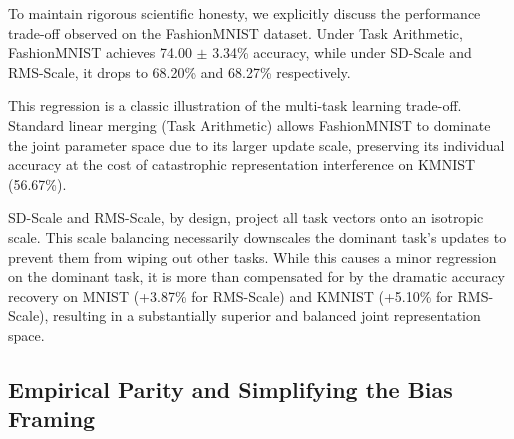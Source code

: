 To maintain rigorous scientific honesty, we explicitly discuss the performance trade-off observed on the FashionMNIST dataset. Under Task Arithmetic, FashionMNIST achieves 74.00 $\pm$ 3.34\% accuracy, while under SD-Scale and RMS-Scale, it drops to 68.20\% and 68.27\% respectively. 

This regression is a classic illustration of the multi-task learning trade-off. Standard linear merging (Task Arithmetic) allows FashionMNIST to dominate the joint parameter space due to its larger update scale, preserving its individual accuracy at the cost of catastrophic representation interference on KMNIST (56.67\%). 

SD-Scale and RMS-Scale, by design, project all task vectors onto an isotropic scale. This scale balancing necessarily downscales the dominant task's updates to prevent them from wiping out other tasks. While this causes a minor regression on the dominant task, it is more than compensated for by the dramatic accuracy recovery on MNIST (+3.87\% for RMS-Scale) and KMNIST (+5.10\% for RMS-Scale), resulting in a substantially superior and balanced joint representation space.

\subsection{Empirical Parity and Simplifying the Bias Framing}

